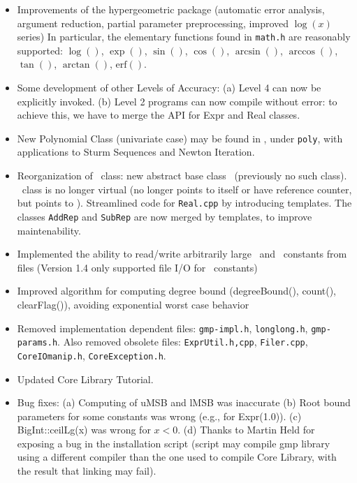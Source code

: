 \documentclass[12pt]{article}
\begin{document}
\begin{itemize}
	\item
           Improvements of the hypergeometric package
               (automatic error analysis, argument reduction,
               partial parameter preprocessing, improved $\log(x)$ series)
               In particular, the elementary functions
               found in \texttt{math.h} are reasonably supported:
	       	$\log()$, $\exp()$, $\sin()$, $\cos()$, $\arcsin()$,
                $\arccos()$, $\tan()$, $\arctan()$, $\textrm{erf}()$.
        \item
	   Some development of other Levels of Accuracy:
	   (a) Level 4 can now be explicitly invoked.
	   (b) Level 2 programs can now compile without error:
		to achieve this, we have to merge the API for Expr
		and Real classes.
        \item
		New Polynomial Class (univariate case) may be found in
		\examplesdir, under \texttt{poly}, with
               applications to Sturm Sequences and Newton Iteration.
        \item
		Reorganization of \real\ class:
               new abstract base class \realrep\ (previously no such class).
               \real\ class is no longer virtual (no longer points to itself
                       or have reference counter, but points to \realrep).
                Streamlined code for \texttt{Real.cpp} by introducing templates.
		The classes \texttt{AddRep} and \texttt{SubRep} are now
		merged by templates, to improve maintenability.
        \item
		Implemented the ability to read/write arbitrarily 
		large \BF\ and \Rat\ constants from files
		(Version 1.4 only supported file I/O for \Int\ constants)
        \item
		Improved algorithm for computing degree bound (degreeBound(),
               count(), clearFlag()), avoiding exponential worst case behavior
        \item
		Removed implementation dependent files:
               \texttt{gmp-impl.h}, \texttt{longlong.h}, \texttt{gmp-params.h}.
		Also removed obsolete files:
               \texttt{ExprUtil.h,cpp}, \texttt{Filer.cpp},
	       \texttt{CoreIOmanip.h}, \texttt{CoreException.h}.
        \item
		Updated Core Library Tutorial.  
        \item
		Bug fixes:
		(a) Computing of uMSB and lMSB was inaccurate
		(b) Root bound parameters for some constants
			was wrong (e.g., for Expr(1.0)).
		(c) BigInt::ceilLg(x) was wrong for $x<0$.
		(d) Thanks to Martin Held for exposing a bug
		in the installation script (script may compile
		gmp library using a different compiler than the one
		used to compile Core Library, with the result that 
		linking may fail).  
	\end{itemize}
\end{document}
